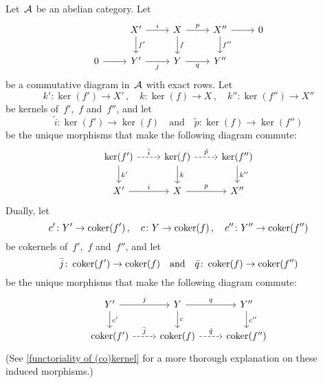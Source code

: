 \begin{lemma}
  \label{snake lemma}
  Let~$\mathcal{A}$ be an abelian category.
  Let
  \begin{equation}
    \label{presnake}
    \begin{tikzcd}
        {}
      & X'
        \arrow{r}[above]{i}
        \arrow{d}[right]{f'}
      & X
        \arrow{r}[above]{p}
        \arrow{d}[right]{f}
      & X''
        \arrow{d}[right]{f''}
        \arrow{r}
      & 0
      \\
        0
        \arrow{r}
      & Y'
        \arrow{r}[below]{j}
      & Y
        \arrow{r}[below]{q}
      & Y''
      & {}
    \end{tikzcd}
  \end{equation}
  be a commutative diagram in~$\mathcal{A}$ with exact rows.
  Let
  \[
    k' \colon \ker(f') \to X' \,,
    \quad
    k \colon \ker(f) \to X \,,
    \quad
    k'' \colon \ker(f'') \to X''
  \]
  be kernels of~$f'$,~$f$ and~$f''$, and let
  \[
    \tilde{i} \colon \ker(f') \to \ker(f)
    \quad\text{and}\quad
    \tilde{p} \colon \ker(f) \to \ker(f'')
  \]
  be the unique morphisms that make the following diagram commute:
  \[
    \begin{tikzcd}
        \ker(f')
        \arrow[dashed]{r}[above]{\tilde{i}}
        \arrow{d}[right]{k'}
      & \ker(f)
        \arrow[dashed]{r}[above]{\tilde{p}}
        \arrow{d}[right]{k}
      & \ker(f'')
        \arrow{d}[right]{k''}
      \\
        X'
        \arrow{r}[above]{i}
      & X
        \arrow{r}[above]{p}
      & X''
    \end{tikzcd}
  \]
  Dually, let
  \[
    c' \colon Y' \to \operatorname{coker}(f') \,,
    \quad
    c \colon Y \to \operatorname{coker}(f) \,,
    \quad
    c'' \colon Y'' \to \operatorname{coker}(f'')
  \]
  be cokernels of~$f'$,~$f$ and~$f''$, and let
  \[
    \bar{j} \colon \operatorname{coker}(f') \to \operatorname{coker}(f)
    \quad\text{and}\quad
    \bar{q} \colon \operatorname{coker}(f) \to \operatorname{coker}(f'')
  \]
  be the unique morphisms that make the following diagram commute:
  \[
    \begin{tikzcd}
        Y'
        \arrow{r}[above]{j}
        \arrow{d}[right]{c'}
      & Y
        \arrow{r}[above]{q}
        \arrow{d}[right]{c}
      & Y''
        \arrow{d}[right]{c''}
      \\
        \coker(f')
        \arrow[dashed]{r}[above]{\bar{j}}
      & \coker(f)
        \arrow[dashed]{r}[above]{\bar{q}}
      & \coker(f'')
    \end{tikzcd}
  \]
  (See \cref{functoriality of (co)kernel} for a more thorough explanation on these induced morphisms.)


\end{lemma}
